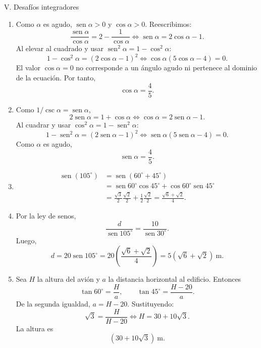\documentclass[letterpaper,12pt]{article}
\newcommand{\seno}{\operatorname{sen}}
\begin{document}
\begin{solbox}{V. Desafíos integradores}
\begin{enumerate}[label=\color{azulFuerte}\textbf{\arabic*.},leftmargin=*,start=31,itemsep=1em]
    \item Como \(\alpha\) es agudo, \(\seno\alpha>0\) y \(\cos\alpha>0\). Reescribimos:
    \[
    \frac{\seno\alpha}{\cos\alpha}
    =2-\frac1{\cos\alpha}
    \iff
    \seno\alpha=2\cos\alpha-1.
    \]
    Al elevar al cuadrado y usar \(\seno^2\alpha=1-\cos^2\alpha\):
    \[
    1-\cos^2\alpha=(2\cos\alpha-1)^2
    \iff
    \cos\alpha(5\cos\alpha-4)=0.
    \]
    El valor \(\cos\alpha=0\) no corresponde a un ángulo agudo ni pertenece al dominio de la ecuación. Por tanto,
    \[
        \boxed{\cos\alpha=\frac45}.
    \]

    \item Como \(1/\csc\alpha=\seno\alpha\),
    \[
        2\seno\alpha=1+\cos\alpha
        \iff
        \cos\alpha=2\seno\alpha-1.
    \]
    Al cuadrar y usar \(\cos^2\alpha=1-\seno^2\alpha\):
    \[
        1-\seno^2\alpha=(2\seno\alpha-1)^2
        \iff
        \seno\alpha(5\seno\alpha-4)=0.
    \]
    Como \(\alpha\) es agudo,
    \[
        \boxed{\seno\alpha=\frac45}.
    \]

    \item
    \[
    \begin{aligned}
    \seno(105^\circ)
    &=\seno(60^\circ+45^\circ)\\
    &=\seno60^\circ\cos45^\circ+\cos60^\circ\seno45^\circ\\
    &=\frac{\sqrt3}{2}\frac{\sqrt2}{2}
      +\frac12\frac{\sqrt2}{2}
    =\boxed{\frac{\sqrt6+\sqrt2}{4}}.
    \end{aligned}
    \]

    \item Por la ley de senos,
    \[
        \frac{d}{\seno105^\circ}
        =\frac{10}{\seno30^\circ}.
    \]
    Luego,
    \[
        d=20\seno105^\circ
        =20\left(\frac{\sqrt6+\sqrt2}{4}\right)
        =\boxed{5(\sqrt6+\sqrt2)\ \text{m}}.
    \]

    \item Sea \(H\) la altura del avión y \(a\) la distancia horizontal al edificio. Entonces
    \[
        \tan60^\circ=\frac{H}{a},
        \qquad
        \tan45^\circ=\frac{H-20}{a}.
    \]
    De la segunda igualdad, \(a=H-20\). Sustituyendo:
    \[
        \sqrt3=\frac{H}{H-20}
        \iff
        H=30+10\sqrt3.
    \]
    La altura es
    \[
        \boxed{(30+10\sqrt3)\ \text{m}}.
    \]


\end{enumerate}
\end{solbox}
\end{document}
